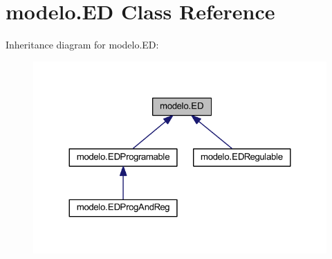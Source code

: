 \hypertarget{classmodelo_1_1_e_d}{}\section{modelo.\+ED Class Reference}
\label{classmodelo_1_1_e_d}


Inheritance diagram for modelo.\+ED\+:
\nopagebreak
\begin{figure}[H]
\begin{center}
\leavevmode
\includegraphics[width=324pt]{classmodelo_1_1_e_d__inherit__graph}
\end{center}
\end{figure}
